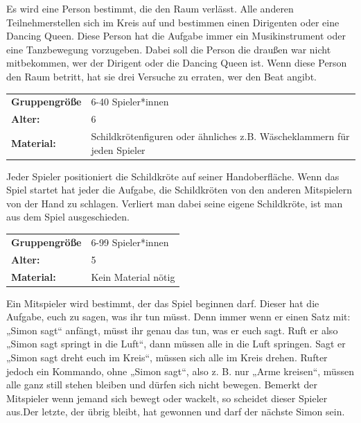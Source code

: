     Es wird eine Person bestimmt, die den Raum verlässt. Alle anderen Teilnehmerstellen sich im Kreis auf und bestimmen einen Dirigenten oder eine Dancing Queen. Diese Person hat die Aufgabe immer ein Musikinstrument oder eine Tanzbewegung vorzugeben. Dabei soll die Person die draußen war nicht mitbekommen, wer der Dirigent oder die Dancing Queen ist. Wenn diese Person den Raum betritt, hat sie drei Versuche zu erraten, wer den Beat angibt.\\


\newpage
\begin{table}[H]
\begin{tabular}{>{\bfseries}lp{8cm}}
   Gruppengröße   & 6-40 Spieler*innen\\
    Alter: & 6 \\
    Material: & Schildkrötenfiguren oder ähnliches z.B. Wäscheklammern für jeden Spieler\\ 
\end{tabular}
\end{table} 

 Jeder Spieler positioniert die Schildkröte auf seiner Handoberfläche. Wenn das Spiel startet hat jeder die Aufgabe, die Schildkröten von den anderen Mitspielern von der Hand zu schlagen. Verliert man dabei seine eigene Schildkröte, ist man aus dem Spiel ausgeschieden. \\


\begin{table}[H]
\begin{tabular}{>{\bfseries}lp{8cm}}
   Gruppengröße   & 6-99 Spieler*innen\\
    Alter: & 5 \\
    Material: & Kein Material nötig\\
\end{tabular}
\end{table} 
Ein Mitspieler wird bestimmt, der das Spiel beginnen darf. Dieser hat die Aufgabe, euch zu sagen, was ihr tun müsst.
Denn immer wenn er einen Satz mit: „Simon sagt“ anfängt, müsst ihr genau das tun, was er euch sagt. Ruft er also „Simon sagt springt in die Luft“, dann müssen alle in die Luft springen. Sagt er „Simon sagt dreht euch im Kreis“, müssen sich alle im Kreis drehen. Rufter jedoch ein Kommando, ohne „Simon sagt“, also z. B. nur „Arme kreisen“, müssen alle ganz still stehen bleiben und dürfen sich nicht bewegen. Bemerkt der Mitspieler wenn jemand sich bewegt oder wackelt, so scheidet dieser Spieler aus.Der letzte, der übrig bleibt, hat gewonnen und darf der nächste Simon sein. \\



